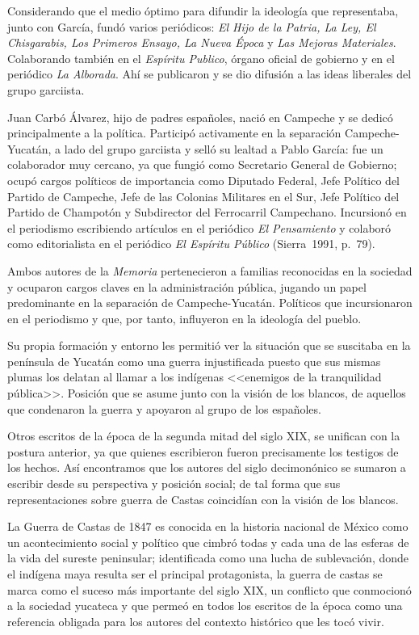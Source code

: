 Considerando que el medio óptimo para difundir la ideología que
representaba, junto con  García, fundó varios periódicos: \textit{El Hijo
de la Patria,  La Ley, El Chisgarabis, Los Primeros Ensayo, La Nueva Época} 
y \textit{Las Mejoras Materiales}. Colaborando también en el
\textit{Espíritu Publico}, órgano oficial de gobierno y en el periódico
\textit{La Alborada}.  Ahí se publicaron y se dio  difusión a las ideas
liberales del grupo garciista.

Juan Carbó Álvarez, hijo de padres españoles, nació en Campeche y se dedicó
principalmente a la política. Participó activamente en la separación
Campeche-Yucatán, a lado del grupo garciista y selló su lealtad a Pablo
García: fue un colaborador muy cercano, ya que fungió como Secretario
General de Gobierno; ocupó cargos políticos  de importancia como Diputado
Federal, Jefe Político del Partido de Campeche, Jefe de las Colonias
Militares en el Sur, Jefe Político del Partido de Champotón y Subdirector
del Ferrocarril Campechano. Incursionó en el periodismo escribiendo
artículos en el periódico \textit{El Pensamiento} y colaboró como
editorialista en el periódico \textit{El Espíritu Público} (Sierra~1991, 
p.~79).
\newpage

Ambos autores de la \textit{Memoria} pertenecieron a familias reconocidas en
la sociedad y ocuparon cargos claves en la administración pública, jugando
un papel predominante en la separación de Campeche-Yucatán. Políticos que
incursionaron en el  periodismo y que,  por tanto, influyeron en la
ideología del pueblo.


Su propia formación y entorno les permitió ver la situación que se suscitaba
en la península de Yucatán como una guerra injustificada puesto que sus
mismas plumas los delatan al llamar  a los indígenas <<enemigos de la
tranquilidad pública>>. Posición que se asume junto con la visión de los
blancos, de aquellos que condenaron la guerra y apoyaron al grupo de los
españoles.

 
Otros escritos de la época de la segunda mitad del siglo XIX, se unifican
con la postura anterior,  ya que quienes escribieron fueron precisamente
los testigos de los hechos. Así encontramos que los autores del siglo
decimonónico se sumaron a escribir desde su perspectiva y posición social;
de tal forma que sus representaciones sobre guerra de Castas coincidían con
la visión de los blancos.

 
La Guerra de Castas de 1847 es conocida en la historia nacional de México
como un acontecimiento social y político que cimbró todas y cada una de las
esferas de la vida del sureste peninsular;  identificada como una lucha de
sublevación, donde el indígena maya resulta ser el  principal protagonista,
la guerra de castas se marca como el suceso más importante del siglo XIX,
un conflicto que conmocionó a la sociedad yucateca y que permeó en todos
los escritos de la época como una referencia obligada para los autores del
contexto histórico que les tocó vivir. 
\enlargethispage{1\baselineskip}
 

